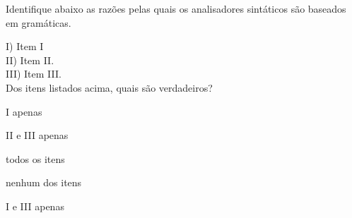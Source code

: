 \question[10]

Identifique abaixo as razões pelas quais os analisadores sintáticos são
baseados em gramáticas.

I) Item I\\
II) Item II.\\
III) Item III.\\

Dos itens listados acima, quais são verdadeiros?\\

\begin{choices}
\item I apenas
\item II e III apenas
\item todos os itens %
\item nenhum dos itens
\item I e III apenas
\end{choices}
\answerline


